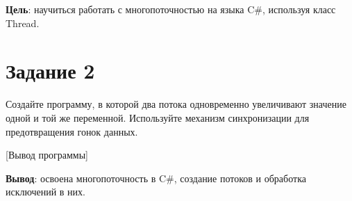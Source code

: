 \documentclass{bsuir}
\newcommand{\csharp}{C{\liberationrm\#}}
\begin{document}
\maketitle
\mainmatter
\renewcommand{\thefigure}{\arabic{figure}}
\renewcommand{\thelisting}{\arabic{listing}}

\textbf{Цель}: научиться работать с многопоточностью на языка \csharp,
используя класс Thread.

\section*{Задание 2}

Создайте программу, в которой два потока одновременно увеличивают значение одной
и той же переменной. Используйте механизм синхронизации для предотвращения гонок
данных.


[Вывод программы]

\textbf{Вывод}: освоена многопоточность в \csharp, создание потоков и обработка
исключений в них.
\end{document}

